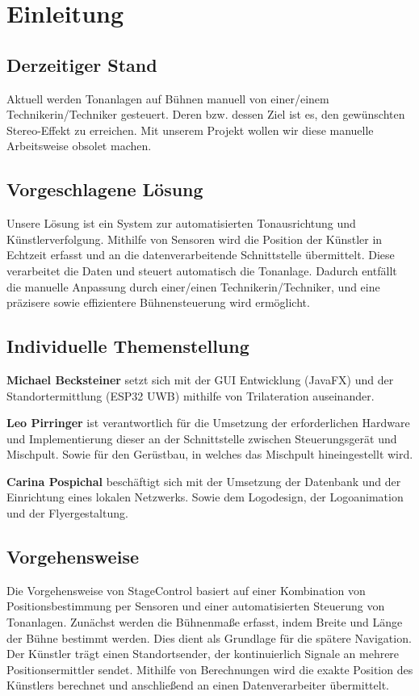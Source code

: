 \chapter{Einleitung}
\section{Derzeitiger Stand}
Aktuell werden Tonanlagen auf Bühnen manuell von einer/einem Technikerin/Techniker gesteuert. Deren bzw. dessen Ziel ist es, den gewünschten Stereo-Effekt zu erreichen. Mit unserem Projekt wollen wir diese manuelle Arbeitsweise obsolet machen.

\section{Vorgeschlagene Lösung}
Unsere Lösung ist ein System zur automatisierten Tonausrichtung und Künstlerverfolgung. Mithilfe von Sensoren wird die Position der Künstler in Echtzeit erfasst und an die datenverarbeitende Schnittstelle übermittelt. Diese verarbeitet die Daten und steuert automatisch die Tonanlage. Dadurch entfällt die manuelle Anpassung durch einer/einen Technikerin/Techniker, und eine präzisere sowie effizientere Bühnensteuerung wird ermöglicht.

\section{Individuelle Themenstellung}
\textbf{Michael Becksteiner} setzt sich mit der GUI Entwicklung (JavaFX) und der Standortermittlung (ESP32 UWB) mithilfe von Trilateration auseinander. 

\textbf{Leo Pirringer} ist verantwortlich für die Umsetzung der erforderlichen Hardware und Implementierung dieser an der Schnittstelle zwischen Steuerungsgerät und Mischpult. Sowie für den Gerüstbau, in welches das Mischpult hineingestellt wird.

\textbf{Carina Pospichal} beschäftigt sich mit der Umsetzung der Datenbank und der Einrichtung eines lokalen Netzwerks. Sowie dem Logodesign, der Logoanimation und der Flyergestaltung.

\section{Vorgehensweise} 
Die Vorgehensweise von StageControl basiert auf einer Kombination von Positionsbestimmung per Sensoren und einer automatisierten Steuerung von Tonanlagen. Zunächst werden die Bühnenmaße erfasst, indem Breite und Länge der Bühne bestimmt werden. Dies dient als Grundlage für die spätere Navigation. Der Künstler trägt einen Standortsender, der kontinuierlich Signale an mehrere Positionsermittler sendet. Mithilfe von Berechnungen wird die exakte Position des Künstlers berechnet und anschließend an einen Datenverarbeiter übermittelt.  

